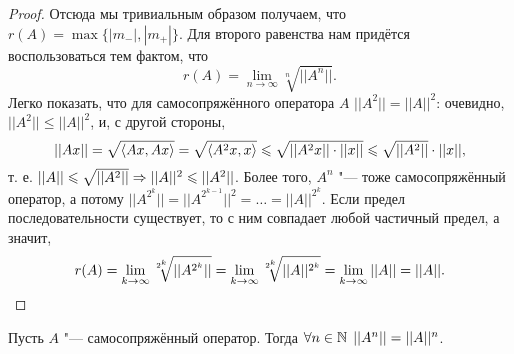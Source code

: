 \documentclass[main]{subfiles}
\begin{document}
\begin{proof}
  Отсюда мы тривиальным образом получаем,
  что \( r(A) = \max \{ |m_-|, |m_+| \} \).
  Для второго равенства нам придётся воспользоваться
  тем фактом, что
  \[
    r(A) = \lim_{n\to\infty} \sqrt[n]{||A^n||}.
  \]
  Легко показать, что
  для самосопряжённого оператора \( A \)
  \( ||A^2|| = ||A||^2 \):
  очевидно, \( ||A^2|| \le ||A||^2 \),
  и, с другой стороны,
  \[
    ||A x|| = \sqrt{\langle Ax, Ax \rangle} =
    \sqrt{\langle A^2 x, x \rangle} \leqslant
    \sqrt{||A^2 x|| \cdot ||x||} \leqslant
    \sqrt{||A^2||} \cdot ||x||,
  \]
  т. е. \( ||A|| \leqslant \sqrt{||A^2||} \Rightarrow
  ||A||^2 \leqslant ||A^2|| \).
  Более того, \( A^n \) "--- тоже самосопряжённый
  оператор, а потому
  \( ||A^{2^k}|| = ||A^{2^{k-1}}||^2 = \dots =
  ||A||^{2^k} \).
  Если предел последовательности существует,
  то с ним совпадает любой частичный предел,
  а значит,
  \[
    r(A) = \lim_{k \to \infty} \sqrt[2^k]{||A^{2^k}||} =
    \lim_{k \to \infty} \sqrt[2^k]{||A||^{2^k}} =
    \lim_{k \to \infty} ||A|| = ||A||. \qedhere
  \]
\end{proof}

\begin{exercise}
  Пусть \( A \) "--- самосопряжённый оператор.
  Тогда \( \forall {n \in \mathbb{N}} \; \, ||A^n|| = ||A||^n \).
\end{exercise}
\end{document}
